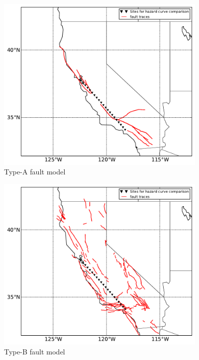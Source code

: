 \begin{figure}[htb]
\centering
\includegraphics[width=10cm]{./qareport/pictures/aFault_aPriori_D2pt1.pdf}
\caption{Type-A fault model}
\label{fig:type_a_fault}
\end{figure}

\begin{figure}[htb]
\centering
\includegraphics[width=10cm]{./qareport/pictures/bFault_stitched_D2pt1_GR0.pdf}
\caption{Type-B fault model}
\label{fig:type_b_fault}
\end{figure}

